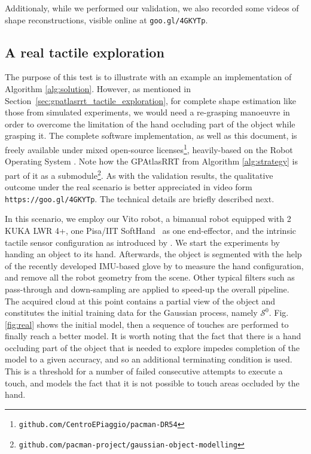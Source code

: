 Additionaly, while we performed our validation, we also recorded some videos of shape reconstructions, visible online at \texttt{goo.gl/4GKYTp}.

\vspace{-2em}
\subsection{A real tactile exploration}
\label{sec:real}

The purpose of this test is to illustrate with an example an implementation of Algorithm \ref{alg:solution}. However, as mentioned in Section~\ref{sec:gpatlasrrt_tactile_exploration}, for complete shape estimation like those from simulated experiments, we would need a re-grasping manoeuvre in order to overcome the limitation of the hand occluding part of the object while grasping it. The complete software implementation, as well as this document, is freely available under mixed open-source licenses\footnote{\texttt{github.com/CentroEPiaggio/pacman-DR54}}, heavily-based on the Robot Operating System \cite{ROS}. Note how the GPAtlasRRT from Algorithm \ref{alg:strategy} is part of it as a submodule\footnote{\texttt{github.com/pacman-project/gaussian-object-modelling}}. As with the validation results, the qualitative outcome under the real scenario is better appreciated in video form \texttt{https://goo.gl/4GKYTp}. The technical details are briefly described next.

In this scenario, we employ our Vito robot, a bimanual robot equipped with 2 KUKA LWR 4+, one Pisa/IIT SoftHand~\cite{Catalano2014Adaptive} as one end-effector, and the intrinsic tactile sensor configuration as introduced by \cite{Rosales2014Active}. We start the experiments by handing an object to its hand. Afterwards, the object is segmented with the help of the recently developed IMU-based glove by \cite{Santaera2015Lowcost} to measure the hand configuration, and remove all the robot geometry from the scene. Other typical filters such as pass-through and down-sampling are applied to speed-up the overall pipeline. The acquired cloud at this point contains a partial view of the object and constitutes the initial training data for the Gaussian process, namely $\mathcal{S}^0$. Fig. \ref{fig:real} shows the initial model, then a sequence of touches are performed to finally reach a better model. It is worth noting that the fact that there is a hand occluding part of the object that is needed to explore impedes completion of the model to a given accuracy, and so an additional terminating condition is used. This is a threshold for a number of failed consecutive attempts to execute a touch, and models the fact that it is not possible to touch areas occluded by the hand.

